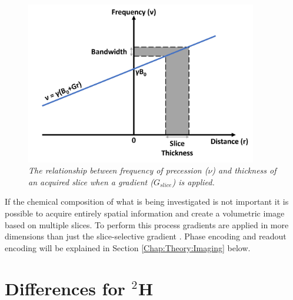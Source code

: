 \begin{figure}
    \centering
    \includegraphics[width=0.9\textwidth]{Figures/Theory/Gradient.png}
    \caption{\textit{The relationship between frequency of precession ($\nu$) and thickness of an acquired slice when a gradient ($G_{slice}$) is applied.}}
    \label{fig:theory:Grad}
\end{figure}

If the chemical composition of what is being investigated is not important it is possible to acquire entirely spatial information and create a volumetric image based on multiple slices. To perform this process gradients are applied in more dimensions than just the slice-selective gradient \cite{deGraaf2019InSpectroscopy}. Phase encoding and readout encoding will be explained in Section \ref{Chap:Theory:Imaging} below.

\section{Differences for $^2$H}

